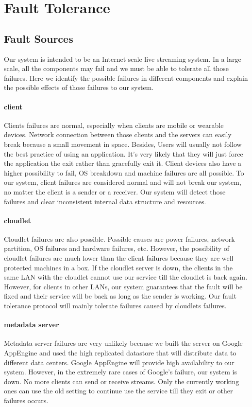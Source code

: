 \documentclass[letterpaper,twocolumn,10pt]{article}
\begin{document}
\section{Fault Tolerance}

\subsection{Fault Sources}
Our system is intended to be an Internet scale live streaming system. In a large scale, all the components may fail and we must be able to tolerate all those failures. Here we identify the possible failures in different components and explain the possible effects of those failures to our system.

\paragraph{client}
Clients failures are normal, especially when clients are mobile or wearable devices. Network connection between those clients and the servers can easily break because a small movement in space. Besides, Users will usually not follow the best practice of using an application. It's very likely that they will just force the application the exit rather than gracefully exit it. Client devices also have a higher possibility to fail, OS breakdown and machine failures are all possible. To our system, client failures are considered normal and will not break our system, no matter the client is a sender or a receiver. Our system will detect those failures and clear inconsistent internal data structure and resources.

\paragraph{cloudlet}
Cloudlet failures are also possible. Possible causes are power failures, network partition, OS failures and hardware failures, etc. However, the possibility of cloudlet failures are much lower than the client failures because they are well protected machines in a box. If the cloudlet server is down, the clients in the same LAN with the cloudlet cannot use our service till the cloudlet is back again. However, for clients in other LANs, our system guarantees that the fault will be fixed and their service will be back as long as the sender is working. Our fault tolerance protocol will mainly tolerate failures caused by cloudlets failures.

\paragraph{metadata server}
Metadata server failures are very unlikely because we built the server on Google AppEngine and used the high replicated datastore that will distribute data to different data centers. Google AppEngine will provide high availability to our system. However, in the extremely rare cases of Google's failure, our system is down. No more clients can send or receive streams. Only the currently working ones can use the old setting to continue use the service till they exit or other failures occurs.
\end{document}
